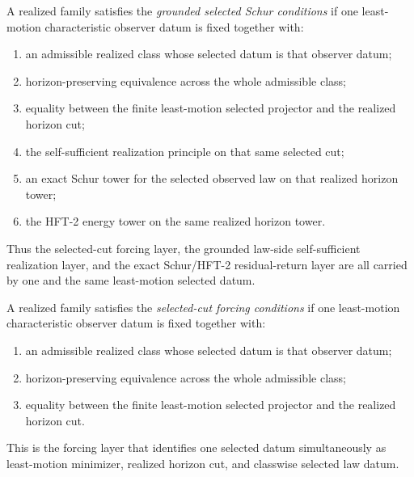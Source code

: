 \begin{definition}
\label{def:grounded-selected-schur-package}
A realized family satisfies the \emph{grounded selected Schur conditions} if one
least-motion characteristic observer datum is fixed together with:
\begin{enumerate}[label=(\roman*), leftmargin=2em, itemsep=0.2em]
\item an admissible realized class whose selected datum is that observer datum;
\item horizon-preserving equivalence across the whole admissible class;
\item equality between the finite least-motion selected projector and the
      realized horizon cut;
\item the self-sufficient realization principle on that same selected cut;
\item an exact Schur tower for the selected observed law on that realized
      horizon tower;
\item the HFT-2 energy tower on the same realized horizon tower.
\end{enumerate}
Thus the selected-cut forcing layer, the grounded law-side self-sufficient
realization layer, and the exact Schur/HFT-2 residual-return layer are all
carried by one and the same least-motion selected datum.
\end{definition}

\begin{definition}
\label{def:selected-cut-forcing-package}
A realized family satisfies the \emph{selected-cut forcing conditions} if one
least-motion characteristic observer datum is fixed together with:
\begin{enumerate}[label=(\roman*), leftmargin=2em, itemsep=0.2em]
\item an admissible realized class whose selected datum is that observer datum;
\item horizon-preserving equivalence across the whole admissible class;
\item equality between the finite least-motion selected projector and the
      realized horizon cut.
\end{enumerate}
This is the forcing layer that identifies one selected datum simultaneously as
least-motion minimizer, realized horizon cut, and classwise selected law datum.
\end{definition}

